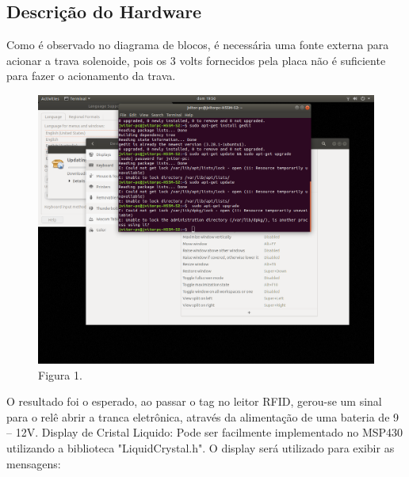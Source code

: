\documentclass[conference,compsoc]{IEEEtran}
\begin{document}
\subsection{Descrição do Hardware}

Como é observado no diagrama de blocos, é necessária uma fonte externa para acionar a trava solenoide, pois os 3 volts fornecidos pela placa não é suficiente para fazer o acionamento da trava.

\begin{figure}[!ht]
		\centering
		\includegraphics[scale=0.15]{nome_da_figura.png}
		\caption{Figura 1.}
\end{figure}

O resultado foi o esperado, ao passar o tag no leitor RFID, gerou-se um sinal para o relê abrir a tranca eletrônica, através da alimentação de uma bateria de 9 – 12V. 
Display de Cristal Liquido: Pode ser facilmente implementado no MSP430 utilizando a biblioteca "LiquidCrystal.h". O display será utilizado para exibir as mensagens:

\end{document}
